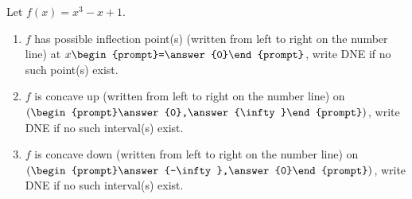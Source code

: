 \documentclass[handout]{ximera}
\author{Gregory Hartman \and Matthew Carr}
\begin{document}
\begin{exercise}




Let $f(x)=x^3-x+1$. 
\begin{enumerate}
\item		$f$ has possible inflection point(s) (written from left to right on the number line) at $x\begin{prompt}=\answer{0}\end{prompt}$, write DNE if no such point(s) exist.
\item		$f$ is concave up (written from left to right on the number line) on $(\begin{prompt}\answer{0},\answer{\infty}\end{prompt})$, write DNE if no such interval(s) exist.
\item		$f$ is concave down (written from left to right on the number line) on $(\begin{prompt}\answer{-\infty},\answer{0}\end{prompt})$, write DNE if no such interval(s) exist.
\end{enumerate}

\end{exercise}
\end{document}
